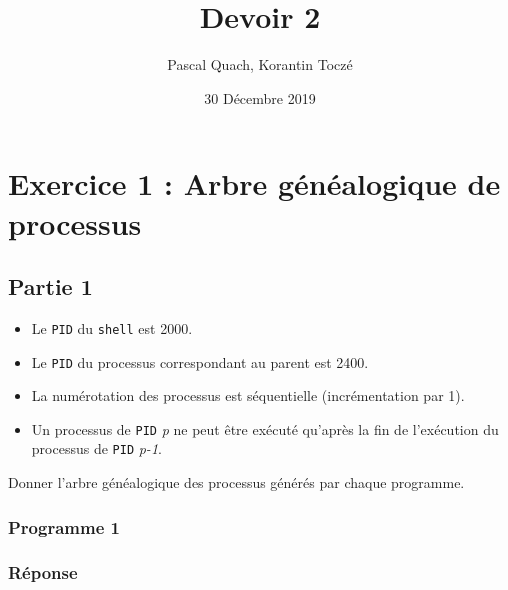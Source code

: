 \documentclass[
	12pt, %
]{fphw}
\title{Devoir 2} %
\author{Pascal Quach, Korantin Toczé} %
\institute{Université de Technologie de Compiègne} %
\date{30 Décembre 2019} %
\begin{document}
\maketitle %

\section*{Exercice 1 : Arbre généalogique de processus}

\subsection*{Partie 1}
\begin{itemize}
	\item Le \texttt{PID} du \texttt{shell} est 2000.
	\item Le \texttt{PID} du processus correspondant au parent est 2400.
	\item La numérotation des processus est séquentielle (incrémentation par 1).
	\item Un processus de \texttt{PID} \textit{p} ne peut être exécuté qu'après la fin de l'exécution du processus de \texttt{PID} \textit{p-1}.
\end{itemize}
\begin{problem}
\centering Donner l'arbre généalogique des processus générés par chaque programme.	
\end{problem}

\subsubsection*{Programme 1}
\begin{problem}
	
\end{problem}
\subsubsection*{Réponse}
\end{document}
